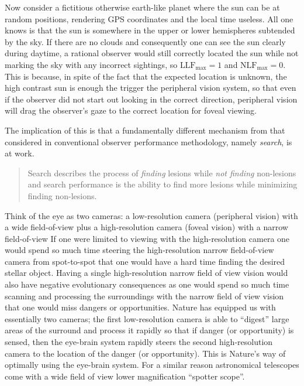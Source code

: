 \documentclass[
]{book}
\begin{document}
Now consider a fictitious otherwise earth-like planet where the sun can be at random positions, rendering GPS coordinates and the local time useless. All one knows is that the sun is somewhere in the upper or lower hemispheres subtended by the sky. If there are no clouds and consequently one can see the sun clearly during daytime, a rational observer would still correctly located the sun while not marking the sky with any incorrect sightings, so \(\text{LLF}_{\text{max}} = 1\) and \(\text{NLF}_{\text{max}} = 0\). This is because, in spite of the fact that the expected location is unknown, the high contrast sun is enough the trigger the peripheral vision system, so that even if the observer did not start out looking in the correct direction, peripheral vision will drag the observer's gaze to the correct location for foveal viewing.

The implication of this is that a fundamentally different mechanism from that considered in conventional observer performance methodology, namely \emph{search}, is at work.

\begin{quote}
Search describes the process of \emph{finding} lesions while \emph{not finding} non-lesions and search performance is the ability to find more lesions while minimizing finding non-lesions.
\end{quote}

Think of the eye as two cameras: a low-resolution camera (peripheral vision) with a wide field-of-view plus a high-resolution camera (foveal vision) with a narrow field-of-view If one were limited to viewing with the high-resolution camera one would spend so much time steering the high-resolution narrow field-of-view camera from spot-to-spot that one would have a hard time finding the desired stellar object. Having a single high-resolution narrow field of view vision would also have negative evolutionary consequences as one would spend so much time scanning and processing the surroundings with the narrow field of view vision that one would miss dangers or opportunities. Nature has equipped us with essentially two cameras; the first low-resolution camera is able to ``digest'' large areas of the surround and process it rapidly so that if danger (or opportunity) is sensed, then the eye-brain system rapidly steers the second high-resolution camera to the location of the danger (or opportunity). This is Nature's way of optimally using the eye-brain system. For a similar reason astronomical telescopes come with a wide field of view lower magnification ``spotter scope''.
\end{document}
